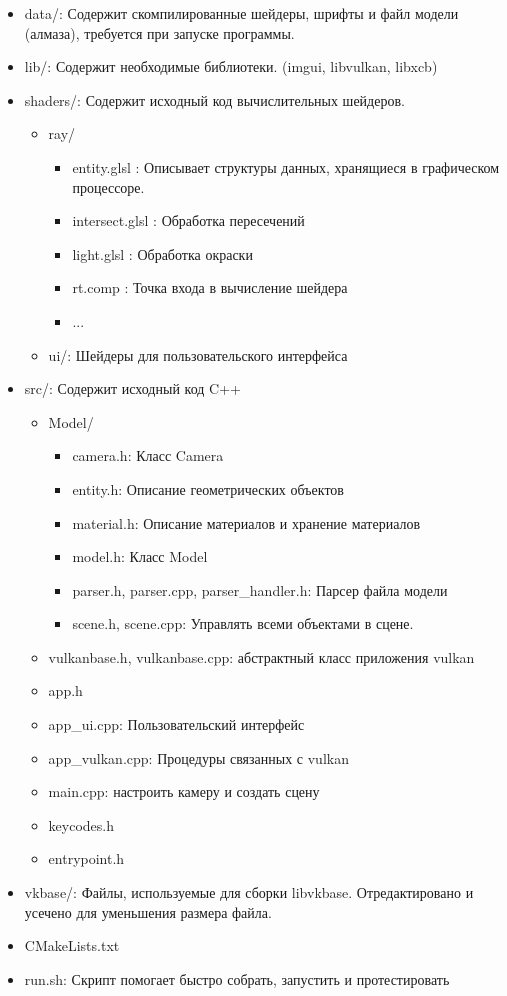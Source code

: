 \begin{itemize}
    \setlength{\itemsep}{0em}
    \item data/: Содержит скомпилированные шейдеры, шрифты и файл модели (алмаза), требуется при запуске программы.
    \item lib/: Содержит необходимые библиотеки. (imgui, libvulkan, libxcb)
    \item shaders/: Содержит исходный код вычислительных шейдеров.
    \begin{itemize}
        \item ray/
        \begin{itemize}
            \item entity.glsl : Описывает структуры данных, хранящиеся в графическом процессоре.
            \item intersect.glsl : Обработка пересечений
            \item light.glsl : Обработка окраски
            \item rt.comp : Точка входа в вычисление шейдера
            \item ...
        \end{itemize}
        \item ui/: Шейдеры для пользовательского интерфейса
    \end{itemize}
    \item src/: Содержит исходный код C++
    \begin{itemize}
        \item Model/
        \begin{itemize}
            \item camera.h: Класс Camera
            \item entity.h: Описание геометрических объектов
            \item material.h: Описание материалов и хранение материалов
            \item model.h: Класс Model
            \item parser.h, parser.cpp, parser\_handler.h: Парсер файла модели
            \item scene.h, scene.cpp: Управлять всеми объектами в сцене.
        \end{itemize}
        \item vulkanbase.h, vulkanbase.cpp: абстрактный класс приложения vulkan
        \item app.h
        \item app\_ui.cpp: Пользовательский интерфейс
        \item app\_vulkan.cpp: Процедуры связанных с vulkan
        \item main.cpp: настроить камеру и создать сцену
        \item keycodes.h
        \item entrypoint.h
    \end{itemize}
    \item vkbase/: Файлы, используемые для сборки libvkbase. Отредактировано и усечено для уменьшения размера файла.
    \item CMakeLists.txt
    \item run.sh: Скрипт помогает быстро собрать, запустить и протестировать
\end{itemize}

